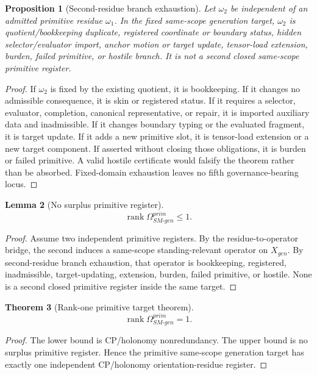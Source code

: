 \documentclass[11pt]{article}
\newcommand{\rank}{\operatorname{rank}}
\theoremstyle{definition}
\theoremstyle{plain}
\newtheorem{theorem}{Theorem}[section]
\newtheorem{lemma}[theorem]{Lemma}
\newtheorem{proposition}[theorem]{Proposition}
\theoremstyle{remark}
\begin{document}
\begin{proposition}[Second-residue branch exhaustion]
Let \(\omega_2\) be independent of an admitted primitive residue \(\omega_1\). In the fixed same-scope generation target, \(\omega_2\) is quotient/bookkeeping duplicate, registered coordinate or boundary status, hidden selector/evaluator import, anchor motion or target update, tensor-load extension, burden, failed primitive, or hostile branch. It is not a second closed same-scope primitive register.
\end{proposition}
\begin{proof}
If \(\omega_2\) is fixed by the existing quotient, it is bookkeeping. If it changes no admissible consequence, it is skin or registered status. If it requires a selector, evaluator, completion, canonical representative, or repair, it is imported auxiliary data and inadmissible. If it changes boundary typing or the evaluated fragment, it is target update. If it adds a new primitive slot, it is tensor-load extension or a new target component. If asserted without closing those obligations, it is burden or failed primitive. A valid hostile certificate would falsify the theorem rather than be absorbed. Fixed-domain exhaustion leaves no fifth governance-bearing locus.
\end{proof}

\begin{lemma}[No surplus primitive register]
\[
\rank \Omega_{SM\text{-}gen}^{prim}\le 1.
\]
\end{lemma}
\begin{proof}
Assume two independent primitive registers. By the residue-to-operator bridge, the second induces a same-scope standing-relevant operator on \(X_{gen}\). By second-residue branch exhaustion, that operator is bookkeeping, registered, inadmissible, target-updating, extension, burden, failed primitive, or hostile. None is a second closed primitive register inside the same target.
\end{proof}

\begin{theorem}[Rank-one primitive target theorem]
\[
\rank \Omega_{SM\text{-}gen}^{prim}=1.
\]
\end{theorem}
\begin{proof}
The lower bound is CP/holonomy nonredundancy. The upper bound is no surplus primitive register. Hence the primitive same-scope generation target has exactly one independent CP/holonomy orientation-residue register.
\end{proof}
\end{document}
